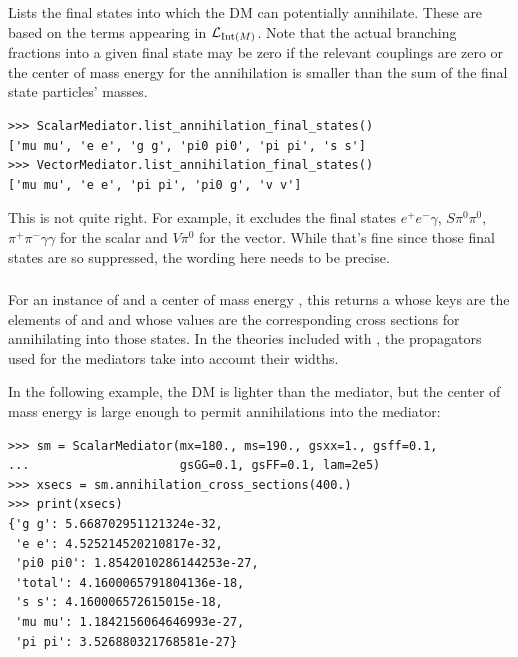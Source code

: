 \subsubsection{}

Lists the final states into which the DM can potentially annihilate. These are based on the terms appearing in $\mathcal{L}_{{\mathrm{Int}}(M)}$. Note that the actual branching fractions into a given final state may be zero if the relevant couplings are zero or the center of mass energy for the annihilation is smaller than the sum of the final state particles' masses. 
\begin{verbatim}
>>> ScalarMediator.list_annihilation_final_states()
['mu mu', 'e e', 'g g', 'pi0 pi0', 'pi pi', 's s']
>>> VectorMediator.list_annihilation_final_states()
['mu mu', 'e e', 'pi pi', 'pi0 g', 'v v']
\end{verbatim}
{\color{red} This is not quite right. For example, it excludes the final states $e^+ e^- \gamma$, $S \pi^0 \pi^0$, $\pi^+ \pi^- \gamma \gamma$ for the scalar and $V \pi^0$ for the vector. While that's fine since those final states are so suppressed, the wording here needs to be precise.}

\subsubsection{}

For an instance  of  and a center of mass energy , this returns a  whose keys are the elements of  and  and whose values are the corresponding cross sections for annihilating into those states. In the theories included with \hazma, the propagators used for the mediators take into account their widths.

In the following example, the DM is lighter than the mediator, but the center of mass energy is large enough to permit annihilations into the mediator:
\begin{verbatim}
>>> sm = ScalarMediator(mx=180., ms=190., gsxx=1., gsff=0.1,
...                     gsGG=0.1, gsFF=0.1, lam=2e5)
>>> xsecs = sm.annihilation_cross_sections(400.)
>>> print(xsecs)
{'g g': 5.668702951121324e-32,
 'e e': 4.525214520210817e-32,
 'pi0 pi0': 1.8542010286144253e-27,
 'total': 4.1600065791804136e-18,
 's s': 4.160006572615015e-18,
 'mu mu': 1.1842156064646993e-27,
 'pi pi': 3.526880321768581e-27}
\end{verbatim}

